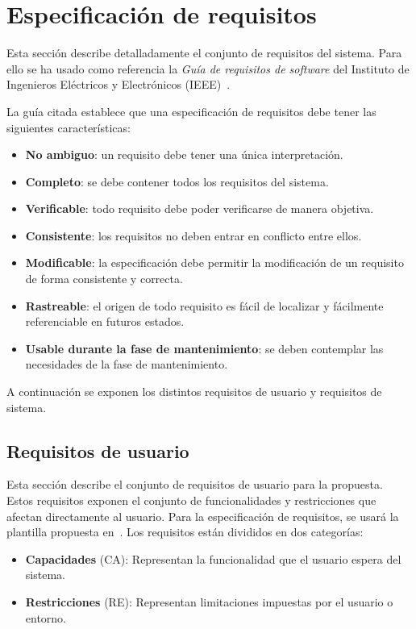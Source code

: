 \section{Especificación de requisitos}\label{sec:requirements}

Esta sección describe detalladamente el conjunto de requisitos del sistema. Para ello se ha usado como referencia la \textit{Guía de requisitos de software} del Instituto de Ingenieros Eléctricos y Electrónicos (IEEE)~\cite{requirements}.

La guía citada establece que una especificación de requisitos debe tener las siguientes características:
\begin{itemize}
\item \textbf{No ambiguo}: un requisito debe tener una única interpretación.
\item \textbf{Completo}: se debe contener todos los requisitos del sistema.
\item \textbf{Verificable}: todo requisito debe poder verificarse de manera objetiva.
\item \textbf{Consistente}: los requisitos no deben entrar en conflicto entre ellos.
\item \textbf{Modificable}: la especificación debe permitir la modificación de un requisito de forma consistente y correcta.
\item \textbf{Rastreable}: el origen de todo requisito es fácil de localizar y fácilmente referenciable en futuros estados.
\item \textbf{Usable durante la fase de mantenimiento}: se deben contemplar las necesidades de la fase de mantenimiento.
\end{itemize}

A continuación se exponen los distintos requisitos de usuario y requisitos de sistema.

\subsection{Requisitos de usuario}\label{subsec:user-req}

Esta sección describe el conjunto de requisitos de usuario para la propuesta.
Estos requisitos exponen el conjunto de funcionalidades y restricciones que
afectan directamente al usuario. Para la especificación de requisitos, se usará
la plantilla propuesta en~\cite{luisda}. Los requisitos están divididos en dos
categorías:

\begin{itemize}
\item \textbf{Capacidades} (CA): Representan la funcionalidad que el usuario espera del sistema.
\item \textbf{Restricciones} (RE): Representan limitaciones impuestas por el usuario o entorno.
\end{itemize}

